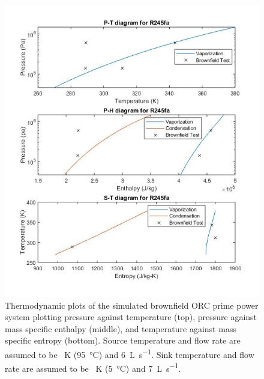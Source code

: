 \begin{figure}[h]
	\centering

	\includegraphics[width=\textwidth]{figures/BrownfieldThermoPlots}
	\caption{Thermodynamic plots of the simulated brownfield ORC prime power system plotting pressure against temperature (top), pressure against mass specific enthalpy (middle), and temperature against mass specific entropy (bottom). Source temperature and flow rate are assumed to be \SI{}{\kelvin} (\SI{95}{\degreeCelsius}) and \SI{6}{\liter\per\second}. Sink temperature and flow rate are assumed to be \SI{}{\kelvin} (\SI{5}{\degreeCelsius}) and \SI{7}{\liter\per\second}.}
	\label{fig:bf_themoplots}
\end{figure}